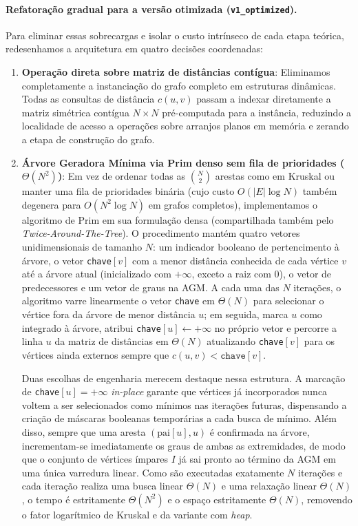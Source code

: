 \paragraph{Refatoração gradual para a versão otimizada (\texttt{v1\_optimized}).}
Para eliminar essas sobrecargas e isolar o custo intrínseco de cada etapa teórica, redesenhamos
a arquitetura em quatro decisões coordenadas:

\begin{enumerate}
  \item \textbf{Operação direta sobre matriz de distâncias contígua}: Eliminamos completamente
  a instanciação do grafo completo em estruturas dinâmicas. Todas as consultas de distância
  $c(u, v)$ passam a indexar diretamente a matriz simétrica contígua $N \times N$ pré-computada
  para a instância, reduzindo a localidade de acesso a operações sobre arranjos planos em memória
  e zerando a etapa de construção do grafo.

  \item \textbf{Árvore Geradora Mínima via Prim denso sem fila de prioridades ($\Theta(N^2)$)}:
  Em vez de ordenar todas as $\binom{N}{2}$ arestas como em Kruskal ou manter uma fila de
  prioridades binária (cujo custo $O(|E| \log N)$ também degenera para $O(N^2 \log N)$ em grafos
  completos), implementamos o algoritmo de Prim em sua formulação densa (compartilhada também
  pelo \textit{Twice-Around-The-Tree}). O procedimento mantém quatro vetores unidimensionais de
  tamanho $N$: um indicador booleano de pertencimento à árvore, o vetor \texttt{chave}$[v]$ com
  a menor distância conhecida de cada vértice $v$ até a árvore atual (inicializado com $+\infty$,
  exceto a raiz com $0$), o vetor de predecessores e um vetor de graus na AGM. A cada uma das
  $N$ iterações, o algoritmo varre linearmente o vetor \texttt{chave} em $\Theta(N)$ para
  selecionar o vértice fora da árvore de menor distância $u$; em seguida, marca $u$ como
  integrado à árvore, atribui \texttt{chave}$[u] \leftarrow +\infty$ no próprio vetor e percorre
  a linha $u$ da matriz de distâncias em $\Theta(N)$ atualizando \texttt{chave}$[v]$ para os
  vértices ainda externos sempre que $c(u, v) < \texttt{chave}[v]$.

  Duas escolhas de engenharia merecem destaque nessa estrutura. A marcação de
  \texttt{chave}$[u] = +\infty$ \textit{in-place} garante que vértices já incorporados nunca
  voltem a ser selecionados como mínimos nas iterações futuras, dispensando a criação de
  máscaras booleanas temporárias a cada busca de mínimo. Além disso, sempre que uma aresta
  $(\text{pai}[u], u)$ é confirmada na árvore, incrementam-se imediatamente os graus de ambas as
  extremidades, de modo que o conjunto de vértices ímpares $I$ já sai pronto ao término da AGM
  em uma única varredura linear. Como são executadas exatamente $N$ iterações e cada iteração
  realiza uma busca linear $\Theta(N)$ e uma relaxação linear $\Theta(N)$, o tempo é
  estritamente $\Theta(N^2)$ e o espaço estritamente $\Theta(N)$, removendo o fator
  logarítmico de Kruskal e da variante com \textit{heap}.


\end{enumerate}
